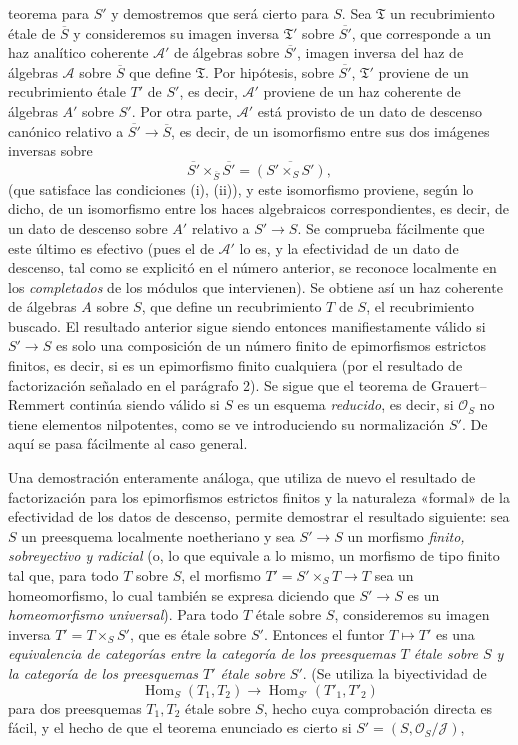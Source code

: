 \documentclass[11pt,twoside,openany]{book}
\numberwithin{equation}{section}
\newcommand{\src}[1]{%
  \phantomsection\hypertarget{src:#1}{}%
  \marginpar{\raggedleft\footnotesize\sffamily #1}%
}
\theoremstyle{plain}
\theoremstyle{definition}
\theoremstyle{remark}
\newcommand{\FgaUnitKey}{frontmatter}
\renewcommand{\src}[1]{%
  \phantomsection\hypertarget{src:\FgaUnitKey:#1}{}%
  \marginpar{\raggedleft\footnotesize\sffamily #1}%
}
\theoremstyle{plain}
\theoremstyle{definition}
\theoremstyle{remark}
\begin{document}
\src{309}
teorema para $S'$ y demostremos que será cierto para $S$. Sea
$\mathfrak T$ un recubrimiento étale de $\overline S$ y consideremos su imagen
inversa $\mathfrak T'$ sobre $\overline{S'}$, que corresponde a un haz
analítico coherente $\mathcal A'$ de álgebras sobre $\overline{S'}$, imagen
inversa del haz de álgebras $\mathcal A$ sobre $\overline S$ que define
$\mathfrak T$. Por hipótesis, sobre $\overline{S'}$, $\mathfrak T'$ proviene de
un recubrimiento étale $T'$ de $S'$, es decir, $\mathcal A'$ proviene de un haz
coherente de álgebras $A'$ sobre $S'$. Por otra parte, $\mathcal A'$ está
provisto de un dato de descenso canónico relativo a
$\overline{S'}\longrightarrow\overline S$, es decir, de un isomorfismo entre
sus dos imágenes inversas sobre
\[
  \overline{S'}\times_{\overline S}\overline{S'}
  =\overline{(S'\times_SS')},
\]
(que satisface las condiciones (i), (ii)), y este isomorfismo proviene, según
lo dicho, de un isomorfismo entre los haces algebraicos correspondientes, es
decir, de un dato de descenso sobre $A'$ relativo a
$S'\longrightarrow S$. Se comprueba fácilmente que este último es efectivo
(pues el de $\mathcal A'$ lo es, y la efectividad de un dato de descenso, tal
como se explicitó en el número anterior, se reconoce localmente en los
\emph{completados} de los módulos que intervienen). Se obtiene así un haz
coherente de álgebras $A$ sobre $S$, que define un recubrimiento $T$ de $S$,
el recubrimiento buscado. El resultado anterior sigue siendo entonces
manifiestamente válido si $S'\longrightarrow S$ es solo una composición de un
número finito de epimorfismos estrictos finitos, es decir, si es un
epimorfismo finito cualquiera (por el resultado de factorización señalado en
el parágrafo 2). Se sigue que el teorema de Grauert--Remmert continúa siendo
válido si $S$ es un esquema \emph{reducido}, es decir, si $\mathcal O_S$ no
tiene elementos nilpotentes, como se ve introduciendo su normalización $S'$.
De aquí se pasa fácilmente al caso general.

Una demostración enteramente análoga, que utiliza de nuevo el resultado de
factorización para los epimorfismos estrictos finitos y la naturaleza «formal»
de la efectividad de los datos de descenso, permite demostrar el resultado
siguiente: sea $S$ un preesquema localmente noetheriano y sea
$S'\longrightarrow S$ un morfismo \emph{finito, sobreyectivo y radicial} (o,
lo que equivale a lo mismo, un morfismo de tipo finito tal que, para todo $T$
sobre $S$, el morfismo $T'=S'\times_ST\longrightarrow T$ sea un homeomorfismo,
lo cual también se expresa diciendo que $S'\longrightarrow S$ es un
\emph{homeomorfismo universal}). Para todo $T$ étale sobre $S$, consideremos
su imagen inversa $T'=T\times_SS'$, que es étale sobre $S'$. Entonces el
funtor $T\longmapsto T'$ es una \emph{equivalencia de categorías entre la
categoría de los preesquemas $T$ étale sobre $S$ y la categoría de los
preesquemas $T'$ étale sobre $S'$}. (Se utiliza la biyectividad de
\[
  \operatorname{Hom}_S(T_1,T_2)\longrightarrow
  \operatorname{Hom}_{S'}(T'_1,T'_2)
\]
para dos preesquemas $T_1,T_2$ étale sobre $S$, hecho cuya comprobación directa
es fácil, y el hecho de que el teorema enunciado es cierto si
$S'=(S,\mathcal O_S/\mathcal J)$,
\end{document}
